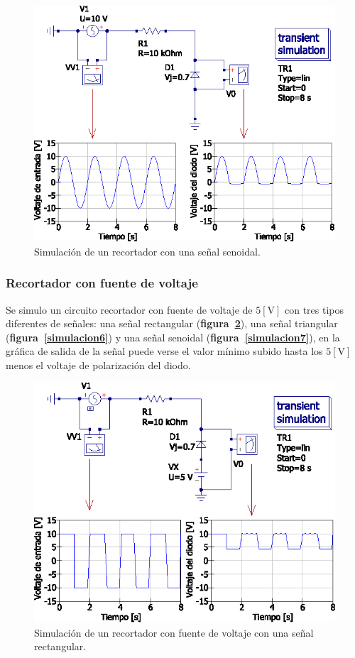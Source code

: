 \documentclass[letter,twoside,11pt]{article}
\begin{document}
\begin{figure}[!h]
\centering
\includegraphics[scale=0.97]{simulacion/practica1.4.eps}
\caption{Simulación de un recortador con una señal senoidal.}
\label{simulacion4}
\end{figure}

\subsubsection{Recortador con fuente de voltaje}
Se simulo un circuito recortador con fuente de voltaje de $5[\text{V}]$ con tres
tipos diferentes de señales: una señal rectangular
(\textbf{figura~\ref{simulacion5}}), una señal triangular
(\textbf{figura~\ref{simulacion6}}) y una señal senoidal
(\textbf{figura~\ref{simulacion7}}), en la gráfica de salida de la señal puede
verse el valor mínimo subido hasta los $5[\text{V}]$ menos el voltaje de
polarización del diodo.

\begin{figure}[!h]
\centering
\includegraphics[scale=0.97]{simulacion/practica1.5.eps}
\caption{Simulación de un recortador con fuente de voltaje con una señal
rectangular.}
\label{simulacion5}
\end{figure}
\end{document}
